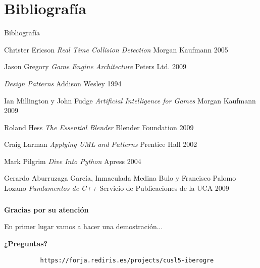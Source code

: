 \documentclass[green]{beamer}
\begin{document}
\section{Bibliografía}
\begin{frame}{Bibliografía}
    \begin{thebibliography}{4}
    \small{
	Christer Ericson
	\emph{Real Time Collision Detection}
	Morgan Kaufmann
	2005
	
	Jason Gregory
	\emph{Game Engine Architecture}
	Peters Ltd.
	2009
	
	\emph{Design Patterns}
	Addison Wesley
	1994
	
	Ian Millington y John Fudge
	\emph{Artificial Intelligence for Games}
	Morgan Kaufmann
	2009
	
	Roland Hess
	\emph{The Essential Blender}
	Blender Foundation
	2009
	
	Craig Larman
	\emph{Applying UML and Patterns}
	Prentice Hall
	2002
	
	Mark Pilgrim
	\emph{Dive Into Python}
	Apress
	2004
	
	Gerardo Aburruzaga García, Inmaculada Medina Bulo y Francisco Palomo Lozano
	\emph{Fundamentos de C++}
	Servicio de Publicaciones de la UCA
	2009
    }
    \end{thebibliography}
\end{frame}

\begin{frame}[fragile]
\transdissolve
    \frametitle{}
    
    \begin{center}
	\textbf{Gracias por su atención}\\
	
	\vspace*{0.5cm}
	
	En primer lugar vamos a hacer una demostración...

	\vspace*{0.7cm}
	
	\pause

	\Huge{\textbf{¿Preguntas?}}
	
	\vspace*{0.7cm}
	
	\small{
	\begin{verbatim}
	      https://forja.rediris.es/projects/cusl5-iberogre
	\end{verbatim}
	}
    \end{center}
\end{frame}


\licencia
\end{document}

